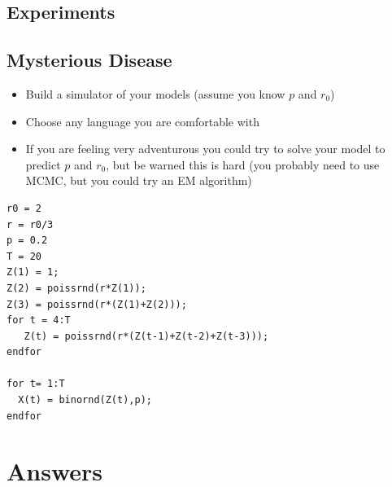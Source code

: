 \documentclass[11pt]{article}
\begin{document}
\subsection{Experiments}
\label{sec:org6d48696}

\subsection{Mysterious Disease}
\label{sec:orgf8dca74}
\begin{itemize}
\item Build a simulator of your models (assume you know \(p\) and \(r_0\))
\item Choose any language you are comfortable with
\item If you are feeling very adventurous you could try to solve your
model to predict \(p\) and \(r_0\), but be warned this is hard (you
probably need to use MCMC, but you could try an EM algorithm)
\end{itemize}

\begin{verbatim}
r0 = 2
r = r0/3
p = 0.2
T = 20
Z(1) = 1;
Z(2) = poissrnd(r*Z(1));
Z(3) = poissrnd(r*(Z(1)+Z(2)));
for t = 4:T
   Z(t) = poissrnd(r*(Z(t-1)+Z(t-2)+Z(t-3)));
endfor

for t= 1:T
  X(t) = binornd(Z(t),p);
endfor
\end{verbatim}

\section{Answers}
\label{sec:org74cb4cf}
\end{document}
